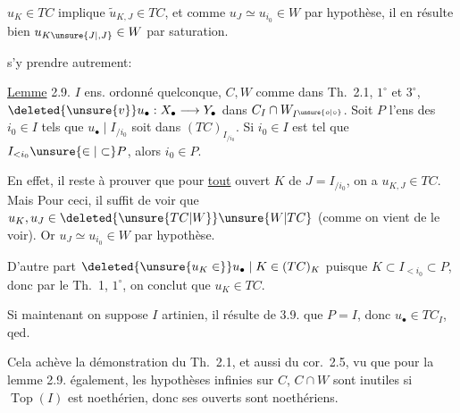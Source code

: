 
$u_K\in TC$ implique $\widetilde u_{K,J}\in TC$, et comme $u_J\simeq u_{i_0}\in W$ par hypothèse, il en résulte bien $u_{K\unsure{J|,J}}\in W$ par saturation. 

 s'y prendre autrement:



\uline{Lemme} 2.9. $I$ ens. ordonné quelconque, $C,W$ comme dans Th.\ 2.1, $1^\circ$ et $3^\circ$, $\deleted{\unsure{v}}u_\bullet:X_\bullet\longrightarrow Y_\bullet$ dans $C_I\cap W_{I^{\unsure{o|\circ}}}$. Soit $P$ l'ens des $i_0\in I$ tels que $u_\bullet\mid I_{/i_0}$ soit dans $(TC)_{I_{/i_0}}$.  Si $i_0\in I$ est tel que $I_{<i_0}\unsure{\in|\subset}P$, alors $i_0\in P$.

En effet,  il reste à prouver que pour \uline{tout} ouvert $K$ de $J=I_{/i_0}$,  on a $u_{K,J}\in TC$. Mais  Pour ceci, il suffit de voir que $u_K,u_J\in\deleted{\unsure{TC|W}}\unsure{W|TC}$ (comme on vient de le voir). Or $u_J\simeq u_{i_0}\in W$ par hypothèse.

D'autre part $\deleted{\unsure{u_K\in}}u_\bullet\mid K\in(TC)_K$  puisque $K\subset I_{<i_0}\subset P$, donc par le Th.\ 1, $1^\circ$, on conclut que $u_K\in TC$.

Si maintenant on suppose $I$ artinien, il résulte de 3.9. que $P=I$, donc $u_\bullet\in TC_I$, qed.

Cela achève la démonstration du Th.\ 2.1, et aussi du cor.\ 2.5, vu que pour la   lemme 2.9. également, les hypothèses infinies sur $C$, $C\cap W$ sont inutiles si $\operatorname{Top}(I)$ est noethérien, donc ses ouverts   sont  noethériens.

